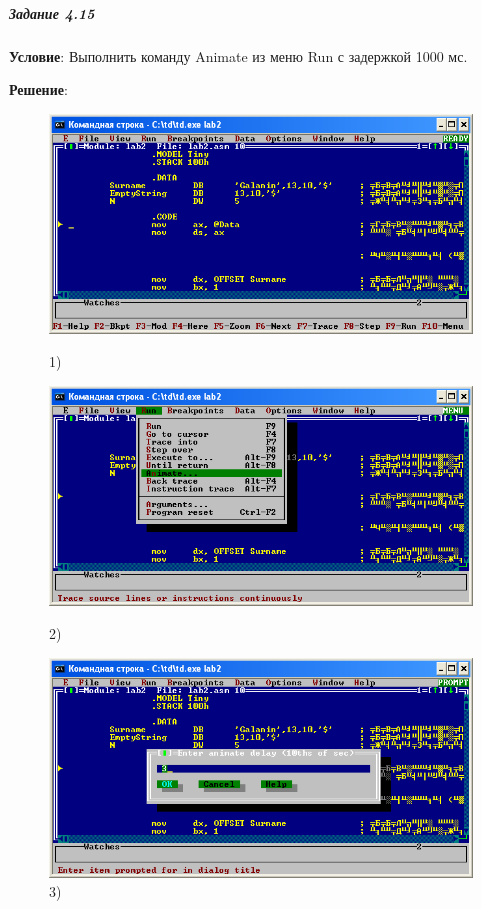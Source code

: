 \subparagraph{Задание 4.15}

\textbf{Условие}:
Выполнить команду Animate из меню Run с задержкой 1000 мс.

\textbf{Решение}:

\begin{figure}[!htp]
    \centering
    \begin{minipage}{0.32\textwidth}
        \centering
        \includegraphics[width=.99\linewidth]
            {../_INCLUDES/task-4-15/1.png}
        \caption{1) }
        \label{fig:task_4_15__1}
    \end{minipage}
    \begin {minipage}{0.32\textwidth}
        \centering
        \includegraphics[width=.99\linewidth]
            {../_INCLUDES/task-4-15/2.png}
        \caption{2) }
        \label{fig:task_4_15__2}
    \end{minipage}
    \begin {minipage}{0.32\textwidth}
        \centering
        \includegraphics[width=.99\linewidth]
            {../_INCLUDES/task-4-15/3.png}
        \caption{3) }
        \label{fig:task_4_15__3}
    \end{minipage}
\end{figure}


